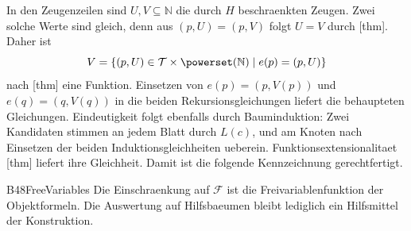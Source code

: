 In den Zeugenzeilen sind \(U,V\subseteq\mathbb N\) die durch \(H\)
beschraenkten Zeugen. Zwei solche Werte sind gleich, denn aus
\((p,U)=(p,V)\) folgt \(U=V\) durch
[thm].
Daher ist
\[
 V=\{(p,U)\in\mathcal T\times\powerset(\mathbb N)\mid e(p)=(p,U)\}
\]
nach [thm] eine Funktion.
Einsetzen von \(e(p)=(p,V(p))\) und \(e(q)=(q,V(q))\) in die beiden
Rekursionsgleichungen liefert die behaupteten Gleichungen.
Eindeutigkeit folgt ebenfalls durch Bauminduktion: Zwei Kandidaten
stimmen an jedem Blatt durch \(L(c)\), und am Knoten nach Einsetzen
der beiden Induktionsgleichheiten ueberein. Funktionsextensionalitaet
[thm] liefert ihre Gleichheit.
Damit ist die folgende Kennzeichnung gerechtfertigt.

{B48FreeVariables}{
}
Die Einschraenkung auf \(\mathcal F\) ist die Freivariablenfunktion
der Objektformeln. Die Auswertung auf Hilfsbaeumen bleibt lediglich
ein Hilfsmittel der Konstruktion.

